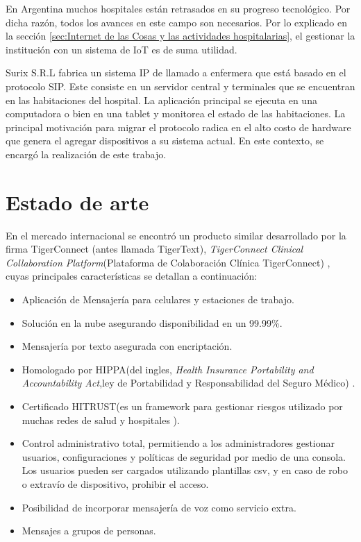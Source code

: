 En Argentina muchos hospitales están retrasados en su progreso tecnológico. Por dicha razón, todos los avances en este campo son  necesarios. Por lo explicado en la sección \ref{sec:Internet de las Cosas y las actividades hospitalarias}, el gestionar la institución con un sistema de IoT es de suma utilidad.

Surix S.R.L fabrica un sistema IP de llamado a enfermera que está basado en el protocolo SIP. Este consiste en un servidor central y terminales que se encuentran en las habitaciones del hospital. La aplicación principal se ejecuta en una computadora o bien en una tablet y monitorea el estado
de las habitaciones. La principal motivación para migrar el protocolo radica en el alto costo de hardware que genera el agregar dispositivos a su sistema actual. En este contexto, se encargó la realización de este trabajo.



\section{Estado de arte}
\label{Estado de arte}

En el mercado internacional se encontró un producto similar  desarrollado por la firma TigerConnect (antes llamada TigerText), \textit{TigerConnect Clinical Collaboration Platform}(Plataforma de Colaboración Clínica TigerConnect) \citep{WEBSITE:2}, cuyas principales características se detallan a continuación:
\begin{itemize}
\item Aplicación de Mensajería para celulares y estaciones de trabajo.
\item Solución en la nube asegurando disponibilidad en un 99.99\%.
\item Mensajería por texto asegurada con encriptación.  
\item Homologado por HIPPA(del ingles, \textit{Health Insurance Portability and Accountability Act},ley de Portabilidad y Responsabilidad del Seguro Médico)  \citep{WEBSITE:3}.  
\item Certificado HITRUST(es un framework para gestionar riesgos utilizado por muchas redes de salud y hospitales \citep{WEBSITE:1}).  
\item Control administrativo total, permitiendo a los administradores gestionar usuarios, configuraciones y políticas de seguridad por medio de una consola. Los usuarios pueden ser cargados utilizando plantillas csv, y en caso de robo o extravío de dispositivo, prohibir el acceso.  
\item Posibilidad de incorporar mensajería de voz como servicio extra.  
\item Mensajes a grupos de personas.  
\end{itemize}

